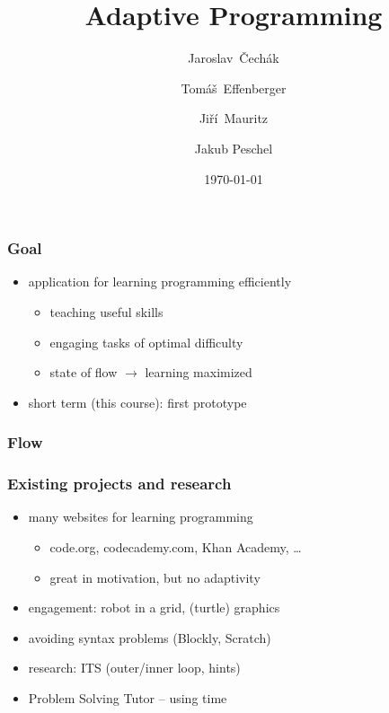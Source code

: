 \documentclass[xcolor=dvipsnames, 14pt]{beamer}
\title{Adaptive Programming}
\author{Jaroslav~Čechák \and Tomáš~Effenberger \and  Jiří~Mauritz \and Jakub Peschel}
\institute{Faculty of Informatics, Masaryk University}
\date{\today}
\begin{document}
\begin{frame}
\titlepage
\end{frame}

\begin{frame}
\frametitle{Goal}
\begin{itemize}
\item application for learning programming efficiently
  \begin{itemize}
  \item teaching useful skills
  \item engaging tasks of optimal difficulty
  \item state of flow $\rightarrow$ learning maximized
  \end{itemize}
\item short term (this course): first prototype
\end{itemize}
\end{frame}

\begin{frame}
\frametitle{Flow}
\begin{figure}[h]
  \centering
\end{figure}
\end{frame}

\begin{frame}
\frametitle{Existing projects and research}
\begin{itemize}
\item many websites for learning programming
  \begin{itemize}
  \item code.org, codecademy.com, Khan Academy, \ldots
  \item great in motivation, but no adaptivity
  \end{itemize}
\item engagement: robot in a grid, (turtle) graphics
\item avoiding syntax problems (Blockly, Scratch)
\item research: ITS (outer/inner loop, hints)
\item Problem Solving Tutor -- using time %
\end{itemize}
\end{frame}
\end{document}
